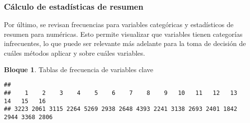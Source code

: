 \documentclass[
]{book}
\newenvironment{Shaded}{\begin{snugshade}}{\end{snugshade}}
\newcommand{\FunctionTok}[1]{\textcolor[rgb]{0.00,0.00,0.00}{#1}}
\newcommand{\NormalTok}[1]{#1}
\newcommand{\SpecialCharTok}[1]{\textcolor[rgb]{0.00,0.00,0.00}{#1}}
\theoremstyle{definition}
\theoremstyle{definition}
\newtheorem{example}{Bloque}[chapter]
\theoremstyle{definition}
\theoremstyle{definition}
\theoremstyle{remark}
\begin{document}
\hypertarget{cuxe1lculo-de-estaduxedsticas-de-resumen}{%
\subsubsection{Cálculo de estadísticas de resumen}\label{cuxe1lculo-de-estaduxedsticas-de-resumen}}

Por último, se revisan frecuencias para variables categóricas y estadísticos de resumen para numéricas. Esto permite visualizar que variables tienen categorías infrecuentes, lo que puede ser relevante más adelante para la toma de decisión de cuáles métodos aplicar y sobre cuáles variables.

\begin{example}
\protect\hypertarget{exm:bloque36nbm}{}\label{exm:bloque36nbm}Tablas de frecuencia de variables clave
\end{example}

\begin{Shaded}
\end{Shaded}

\begin{verbatim}
## 
##    1    2    3    4    5    6    7    8    9   10   11   12   13   14   15   16 
## 3223 2061 3115 2264 5269 2938 2648 4393 2241 3138 2693 2401 1842 2944 3368 2806
\end{verbatim}

\begin{Shaded}
\end{Shaded}
\end{document}
